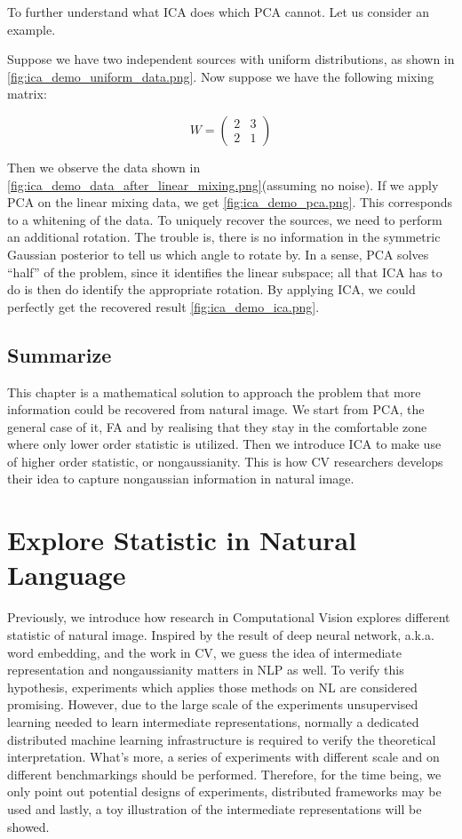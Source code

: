 \documentclass[a4paper]{book}
\begin{document}
  To further understand what ICA does which PCA cannot. Let us consider
  an example\cite{murphy2012machine}.

  Suppose we have two independent sources with uniform distributions, as
  shown in \cref{fig:ica_demo_uniform_data.png}. Now suppose we have the
  following mixing matrix:

  \begin{displaymath}
    W = 
    \begin{pmatrix}
      2 & 3 \\
      2 & 1
    \end{pmatrix}
  \end{displaymath}

  Then we observe the data shown in
  \cref{fig:ica_demo_data_after_linear_mixing.png}(assuming no noise).
  If we apply PCA on the linear mixing data, we get
  \cref{fig:ica_demo_pca.png}. This corresponds to a whitening of the
  data. To uniquely recover the sources, we need to perform an
  additional rotation. The trouble is, there is no information in the
  symmetric Gaussian posterior to tell us which angle to rotate by. In a
  sense, PCA solves ``half'' of the problem, since it identifies the
  linear subspace; all that ICA has to do is then do identify the
  appropriate rotation. By applying ICA, we could perfectly get the
  recovered result \cref{fig:ica_demo_ica.png}.


  \section{Summarize}

  This chapter is a mathematical solution to approach the problem that
  more information could be recovered from natural image. We start from
  PCA, the general case of it, FA and by realising that they stay in the
  comfortable zone where only lower order statistic is utilized. Then we
  introduce ICA to make use of higher order statistic, or
  nongaussianity. This is how CV researchers develops their idea to
  capture nongaussian information in natural image.

\chapter{Explore Statistic in Natural Language}
Previously, we introduce how research in Computational Vision explores
different statistic of natural image. Inspired by the result of deep
neural network, a.k.a. word embedding, and the work in CV, we guess the
idea of intermediate representation and nongaussianity matters in NLP as
well. To verify this hypothesis, experiments which applies those methods
on NL are considered promising. However, due to the large scale of the
experiments unsupervised learning needed to learn intermediate
representations, normally a dedicated distributed machine learning
infrastructure is required to verify the theoretical interpretation.
What's more, a series of experiments with different scale and on
different benchmarkings should be performed. Therefore, for the time
being, we only point out potential designs of experiments, distributed
frameworks may be used and lastly, a toy illustration of the
intermediate representations will be showed.
\end{document}
